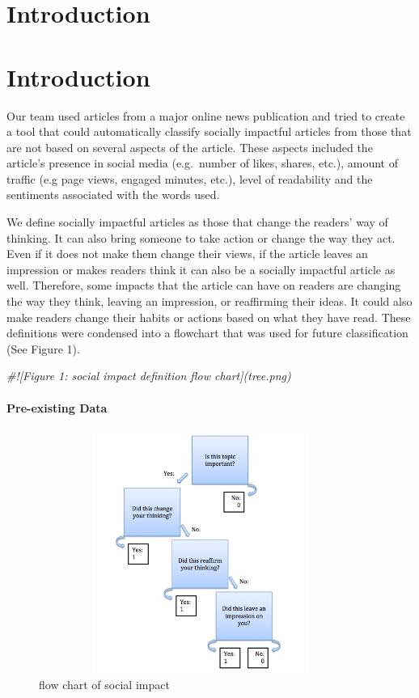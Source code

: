 \documentclass[10pt,letterpaper]{article}
\newenvironment{Shaded}{\begin{snugshade}}{\end{snugshade}}
\newcommand{\CommentTok}[1]{\textcolor[rgb]{0.56,0.35,0.01}{\textit{#1}}}
\begin{document}
\linenumbers

\section{Introduction}\label{introduction}
\hypertarget{introduction}{%
\section{Introduction}\label{introduction}}

Our team used articles from a major online news publication and tried to
create a tool that could automatically classify socially impactful
articles from those that are not based on several aspects of the
article. These aspects included the article's presence in social media
(e.g.~number of likes, shares, etc.), amount of traffic (e.g page views,
engaged minutes, etc.), level of readability and the sentiments
associated with the words used.

We define socially impactful articles as those that change the readers'
way of thinking. It can also bring someone to take action or change the
way they act. Even if it does not make them change their views, if the
article leaves an impression or makes readers think it can also be a
socially impactful article as well. Therefore, some impacts that the
article can have on readers are changing the way they think, leaving an
impression, or reaffirming their ideas. It could also make readers
change their habits or actions based on what they have read. These
definitions were condensed into a flowchart that was used for future
classification (See Figure 1).

\begin{Shaded}
\begin{Highlighting}[]
\CommentTok{#![Figure 1: social impact definition flow chart](tree.png)}
\end{Highlighting}
\end{Shaded}

\paragraph{Pre-existing Data}\label{pre-existing-data}
\begin{figure}
\includegraphics[width=400px,height=300px]{flow-chart} \caption{flow chart of social impact}\label{fig:unnamed-chunk-1}
\end{figure}
\end{document}

